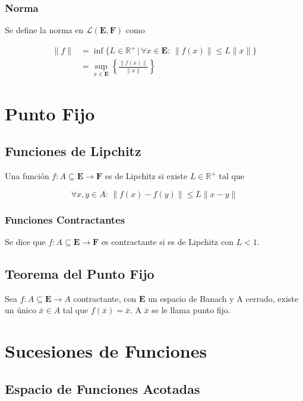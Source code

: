 \subsubsection{Norma}

Se define la norma en $\mathcal{L}(\mathbf{E},\mathbf{F})$ como

\begin{equation}
\begin{split}
\|f\| &= \inf\{L\in\mathbb{R}^+\,|\,\forall x\in
\mathbf{E}:\,\|f(x)\|\leq L\|x\|\}\\
&= \sup_{x\in\mathbf{E}}\left\{\frac{\|f(x)\|}{\|x\|}\right\}
\end{split}
\nonumber
\end{equation}

\section{Punto Fijo}

\subsection{Funciones de Lipchitz}

Una función $f:A\subseteq\mathbf{E}\to\mathbf{F}$ es de Lipchitz si existe $L\in\mathbb{R}^+$ tal que

\[\forall x,y\in A:\, \|f(x)-f(y)\|\leq L\|x-y\|\]

\subsubsection{Funciones Contractantes}

Se dice que $f:A\subseteq\mathbf{E}\to\mathbf{F}$ es contractante si es de Lipchitz con $L<1$.

\subsection{Teorema del Punto Fijo}
\label{T:.PuntoFijo}

Sea $f:A\subseteq\mathbf{E}\to A$ contractante, con $\mathbf{E}$ un espacio de Banach y A cerrado, existe un único $\bar{x}\in A$ tal que $f(\bar{x})=\bar{x}$. A $\bar{x}$ se le llama punto fijo.

\section{Sucesiones de Funciones}

\subsection{Espacio de Funciones Acotadas}

